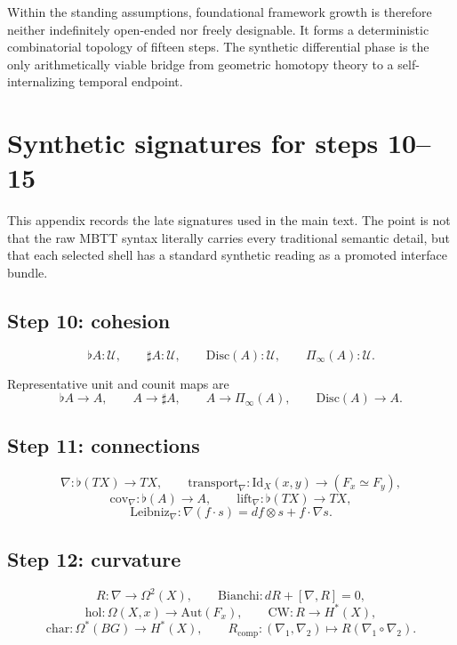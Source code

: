 \documentclass[11pt]{article}
\theoremstyle{plain}
\theoremstyle{definition}
\theoremstyle{remark}
\newcommand{\U}{\mathcal{U}}
\newcommand{\Shape}{\Pi_{\!\infty}}
\newcommand{\Disc}{\mathrm{Disc}}
\newcommand{\hol}{\mathrm{hol}}
\newcommand{\charclass}{\mathrm{char}}
\newcommand{\Id}{\mathrm{Id}}
\begin{document}
Within the standing assumptions, foundational framework growth is therefore neither indefinitely open-ended nor freely designable. It forms a deterministic combinatorial topology of fifteen steps. The synthetic differential phase is the only arithmetically viable bridge from geometric homotopy theory to a self-internalizing temporal endpoint.

\appendix

\section{Synthetic signatures for steps 10--15}

This appendix records the late signatures used in the main text. The point is not that the raw MBTT syntax literally carries every traditional semantic detail, but that each selected shell has a standard synthetic reading as a promoted interface bundle.

\subsection{Step 10: cohesion}

\[
  \flat A:\U,
  \qquad
  \sharp A:\U,
  \qquad
  \Disc(A):\U,
  \qquad
  \Shape(A):\U.
\]

Representative unit and counit maps are
\[
  \flat A\to A,
  \qquad
  A\to \sharp A,
  \qquad
  A\to \Shape(A),
  \qquad
  \Disc(A)\to A.
\]

\subsection{Step 11: connections}

\[
  \nabla:\flat(TX)\to TX,
  \qquad
  \mathrm{transport}_\nabla:\Id_X(x,y)\to(F_x\simeq F_y),
\]
\[
  \mathrm{cov}_\nabla:\flat(A)\to A,
  \qquad
  \mathrm{lift}_\nabla:\flat(TX)\to TX,
\]
\[
  \mathrm{Leibniz}_\nabla:\nabla(f\cdot s)=df\otimes s + f\cdot\nabla s.
\]

\subsection{Step 12: curvature}

\[
  R:\nabla\to\Omega^2(X),
  \qquad
  \mathrm{Bianchi}: dR+[\nabla,R]=0,
\]
\[
  \hol:\Omega(X,x)\to\mathrm{Aut}(F_x),
  \qquad
  \mathrm{CW}:R\to H^*(X),
\]
\[
  \charclass:\Omega^*(BG)\to H^*(X),
  \qquad
  R_{\mathrm{comp}}:(\nabla_1,\nabla_2)\mapsto R(\nabla_1\circ\nabla_2).
\]
\end{document}
